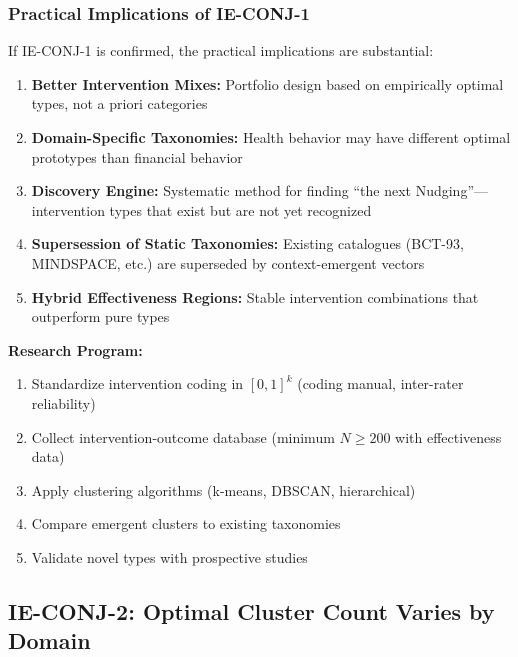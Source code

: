 \subsubsection{Practical Implications of IE-CONJ-1}
\label{subsubsec:conj1-implications}

If IE-CONJ-1 is confirmed, the practical implications are substantial:

\begin{enumerate}
    \item \textbf{Better Intervention Mixes:} Portfolio design based on empirically optimal types, not a priori categories

    \item \textbf{Domain-Specific Taxonomies:} Health behavior may have different optimal prototypes than financial behavior

    \item \textbf{Discovery Engine:} Systematic method for finding ``the next Nudging''---intervention types that exist but are not yet recognized

    \item \textbf{Supersession of Static Taxonomies:} Existing catalogues (BCT-93, MINDSPACE, etc.) are superseded by context-emergent vectors

    \item \textbf{Hybrid Effectiveness Regions:} Stable intervention combinations that outperform pure types
\end{enumerate}

\textbf{Research Program:}
\begin{enumerate}[nosep]
    \item Standardize intervention coding in $[0,1]^k$ (coding manual, inter-rater reliability)
    \item Collect intervention-outcome database (minimum $N \geq 200$ with effectiveness data)
    \item Apply clustering algorithms (k-means, DBSCAN, hierarchical)
    \item Compare emergent clusters to existing taxonomies
    \item Validate novel types with prospective studies
\end{enumerate}

\subsection{IE-CONJ-2: Optimal Cluster Count Varies by Domain}
\label{subsec:ie-conj-2}

